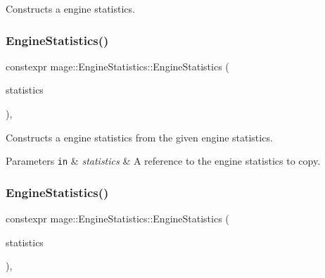 Constructs a engine statistics. \hypertarget{classmage_1_1_engine_statistics_a31a2068d0346392755e431afed37f8f5}{}\label{classmage_1_1_engine_statistics_a31a2068d0346392755e431afed37f8f5} 
\subsubsection{\texorpdfstring{Engine\+Statistics()}{EngineStatistics()}\hspace{0.1cm}{\footnotesize\ttfamily [2/3]}}
{\footnotesize\ttfamily constexpr mage\+::\+Engine\+Statistics\+::\+Engine\+Statistics (\begin{DoxyParamCaption}\item[{const \hyperlink{classmage_1_1_engine_statistics}{Engine\+Statistics} \&}]{statistics }\end{DoxyParamCaption})\hspace{0.3cm}{\ttfamily [default]}, {\ttfamily [noexcept]}}

Constructs a engine statistics from the given engine statistics.


\begin{DoxyParams}[1]{Parameters}
\mbox{\tt in}  & {\em statistics} & A reference to the engine statistics to copy. \\
\hline
\end{DoxyParams}
\hypertarget{classmage_1_1_engine_statistics_ac050f7bfeea2cc8e59f771073fc3ee4c}{}\label{classmage_1_1_engine_statistics_ac050f7bfeea2cc8e59f771073fc3ee4c} 
\subsubsection{\texorpdfstring{Engine\+Statistics()}{EngineStatistics()}\hspace{0.1cm}{\footnotesize\ttfamily [3/3]}}
{\footnotesize\ttfamily constexpr mage\+::\+Engine\+Statistics\+::\+Engine\+Statistics (\begin{DoxyParamCaption}\item[{\hyperlink{classmage_1_1_engine_statistics}{Engine\+Statistics} \&\&}]{statistics }\end{DoxyParamCaption})\hspace{0.3cm}{\ttfamily [default]}, {\ttfamily [noexcept]}}

